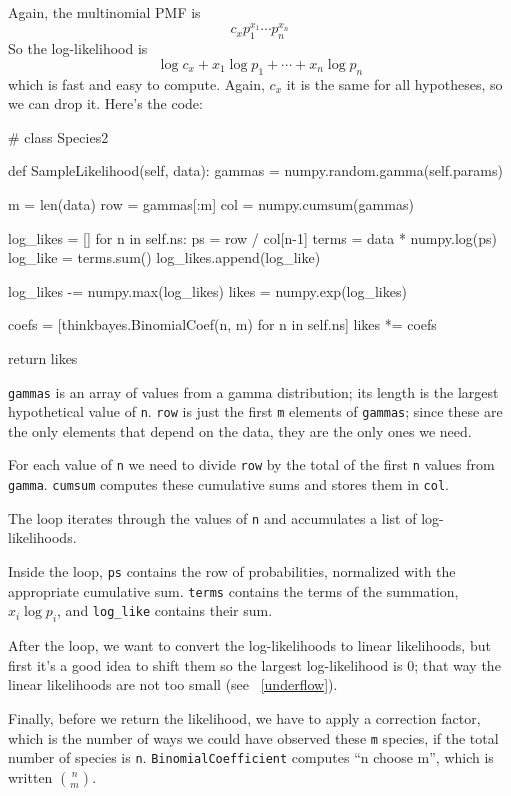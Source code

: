 \documentclass[12pt]{book}
\theoremstyle{exercise}
\begin{document}
Again, the multinomial PMF is
%
\[ c_x p_1^{x_1} \cdots p_n^{x_n} \]
%
So the log-likelihood is
%
\[ \log c_x + x_1 \log p_1 + \cdots + x_n \log p_n \]
%
which is fast and easy to compute.  Again, $c_x$
it is the same for all hypotheses, so we can drop it.
Here's the code:

\begin{code}
# class Species2

    def SampleLikelihood(self, data):
        gammas = numpy.random.gamma(self.params)

        m = len(data)
        row = gammas[:m]
        col = numpy.cumsum(gammas)

        log_likes = []
        for n in self.ns:
            ps = row / col[n-1]
            terms = data * numpy.log(ps)
            log_like = terms.sum()
            log_likes.append(log_like)

        log_likes -= numpy.max(log_likes)
        likes = numpy.exp(log_likes)

        coefs = [thinkbayes.BinomialCoef(n, m) for n in self.ns]
        likes *= coefs

        return likes
\end{code}

{\tt gammas} is an array of values from a gamma distribution; its
length is the largest hypothetical value of {\tt n}.  {\tt row} is
just the first {\tt m} elements of {\tt gammas}; since these are the
only elements that depend on the data, they are the only ones we need.

For each value of {\tt n} we need to divide {\tt row} by the
total of the first {\tt n} values from {\tt gamma}.  {\tt cumsum}
computes these cumulative sums and stores them in {\tt col}.

The loop iterates through the values of {\tt n} and accumulates
a list of log-likelihoods.

Inside the loop, {\tt ps} contains the row of probabilities, normalized
with the appropriate cumulative sum.  {\tt terms} contains the
terms of the summation, $x_i \log p_i$, and \verb"log_like" contains
their sum.

After the loop, we want to convert the log-likelihoods to linear
likelihoods, but first it's a good idea to shift them so the largest
log-likelihood is 0; that way the linear likelihoods are not too
small (see ~\ref{underflow}).

Finally, before we return the likelihood, we have to apply a correction
factor, which is the number of ways we could have observed these {\tt m}
species, if the total number of species is {\tt n}.  
{\tt BinomialCoefficient} computes ``n choose m'', which is written
$\binom{n}{m}$. 
\end{document}
